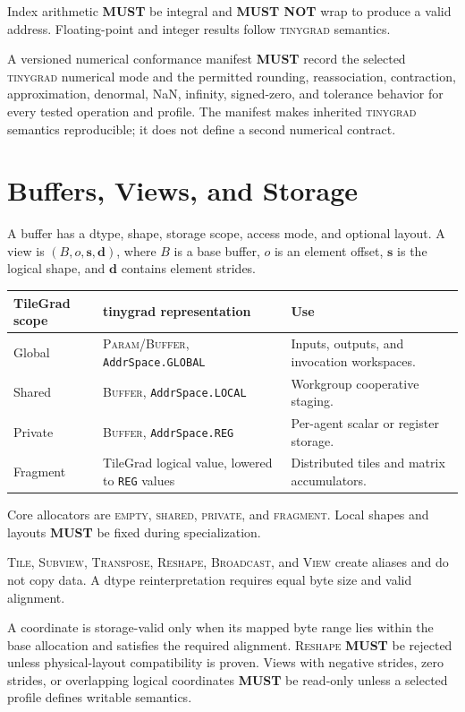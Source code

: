 \documentclass[10pt,letterpaper]{article}
\newcommand{\tinygrad}{\textsc{tinygrad}}
\newcommand{\op}[1]{\textsc{#1}}
\newcommand{\must}{\textbf{MUST}}
\newcommand{\mustnot}{\textbf{MUST NOT}}
\begin{document}
Index arithmetic \must{} be integral and \mustnot{} wrap to produce a valid
address. Floating-point and integer results follow \tinygrad{} semantics.

A versioned numerical conformance manifest \must{} record the selected
\tinygrad{} numerical mode and the permitted rounding, reassociation,
contraction, approximation, denormal, NaN, infinity, signed-zero, and tolerance
behavior for every tested operation and profile. The manifest makes inherited
\tinygrad{} semantics reproducible; it does not define a second numerical
contract.

\section*{Buffers, Views, and Storage}

A buffer has a dtype, shape, storage scope, access mode, and optional layout. A
view is $(B,o,\mathbf{s},\mathbf{d})$, where $B$ is a base buffer, $o$ is an
element offset, $\mathbf{s}$ is the logical shape, and $\mathbf{d}$ contains
element strides.

\begin{center}
\begin{tabularx}{\textwidth}{@{}lYY@{}}
\toprule
\textbf{TileGrad scope} & \textbf{tinygrad representation} & \textbf{Use} \\
\midrule
Global & \op{Param}/\op{Buffer}, \texttt{AddrSpace.GLOBAL} & Inputs, outputs,
and invocation workspaces. \\
Shared & \op{Buffer}, \texttt{AddrSpace.LOCAL} & Workgroup cooperative staging. \\
Private & \op{Buffer}, \texttt{AddrSpace.REG} & Per-agent scalar or register storage. \\
Fragment & TileGrad logical value, lowered to \texttt{REG} values & Distributed
tiles and matrix accumulators. \\
\bottomrule
\end{tabularx}
\end{center}

Core allocators are \op{empty}, \op{shared}, \op{private}, and \op{fragment}.
Local shapes and layouts \must{} be fixed during specialization.

\op{Tile}, \op{Subview}, \op{Transpose}, \op{Reshape}, \op{Broadcast}, and
\op{View} create aliases and do not copy data. A dtype reinterpretation requires
equal byte size and valid alignment.

A coordinate is storage-valid only when its mapped byte range lies within the
base allocation and satisfies the required alignment. \op{Reshape} \must{} be
rejected unless physical-layout compatibility is proven. Views with negative
strides, zero strides, or overlapping logical coordinates \must{} be read-only
unless a selected profile defines writable semantics.
\end{document}

